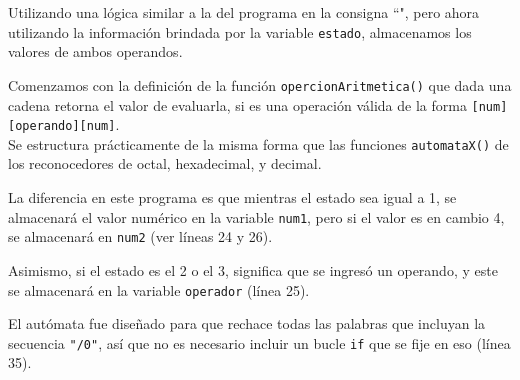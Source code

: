 \documentclass[a4paper, 12pt]{article}
\begin{document}
\begin{center}
\end{center}

Utilizando una lógica similar a la del programa en la consigna ``", pero ahora utilizando la información brindada por la variable \texttt{estado}, almacenamos los valores de ambos operandos.

Comenzamos con la definición de la función \texttt{opercionAritmetica()} que dada una cadena retorna el valor de evaluarla, si es una operación válida de la forma \texttt{[num][operando][num]}. \\
Se estructura prácticamente de la misma forma que las funciones \texttt{automataX()} de los reconocedores de octal, hexadecimal, y decimal.

La diferencia en este programa es que mientras el estado sea igual a 1, se almacenará el valor numérico en la variable \texttt{num1}, pero si el valor es en cambio 4, se almacenará en \texttt{num2} (ver líneas 24 y 26).

Asimismo, si el estado es el 2 o el 3, significa que se ingresó un operando, y este se almacenará en la variable \texttt{operador} (línea 25).

El autómata fue diseñado para que rechace todas las palabras que incluyan la secuencia \verb|"/0"|, así que no es necesario incluir un bucle \texttt{if} que se fije en eso (línea 35).
\end{document}
